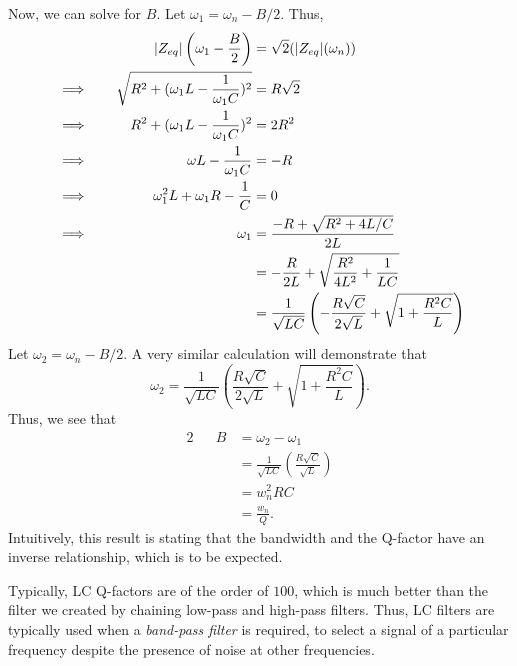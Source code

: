 \documentclass[letterpaper]{article}
\theoremstyle{remark}
\DeclarePairedDelimiter\abs{\lvert}{\rvert}%
\newcommand{\eqn}[1]{\begin{alignat*}{2}#1\end{alignat*}}
\newcommand*{\thus}{&\implies\quad&}
\begin{document}
Now, we can solve for $B$. Let $\omega_1 = \omega_n - B/2$. Thus,
\eqn{
    && \abs{Z_{eq}}\left(\omega_1 - \frac{B}{2}\right) &= \sqrt{2} (\abs{Z_{eq}}(\omega_n)) \\
    \thus \sqrt{R^2 + (\omega_1 L - \frac{1}{\omega_1 C})^2} &= R\sqrt{2} \\
    \thus R^2 + (\omega_1 L - \frac{1}{\omega_1 C})^2 &= 2R^2 \\
    \thus \omega L - \frac{1}{\omega_1 C} &= -R \\
    \thus \omega_1^2 L + \omega_1 R - \frac{1}{C} &= 0 \\
    \thus \omega_1 &= \frac{-R + \sqrt{R^2 + 4L / C}}{2L} \\
    &&&= -\frac{R}{2L} + \sqrt{\frac{R^2}{4L^2} + \frac{1}{LC}} \\
    &&&= \frac{1}{\sqrt{LC}} \left(-\frac{R\sqrt{C}}{2\sqrt{L}} + \sqrt{1 + \frac{R^2C}{L}} \right) \\
}
Let $\omega_2 = \omega_n - B/2$. A very similar calculation will demonstrate that
\[
    \omega_2 = \frac{1}{\sqrt{LC}} \left(\frac{R\sqrt{C}}{2\sqrt{L}} + \sqrt{1 + \frac{R^2C}{L}} \right).
\]
Thus, we see that
\eqn{
    && B &= \omega_2 - \omega_1 \\
    &&&= \frac{1}{\sqrt{LC}} \left(\frac{R\sqrt{C}}{\sqrt{L}} \right) \\
    &&&= w_n^2 RC \\
    &&&= \frac{w_n}{Q}.
}
Intuitively, this result is stating that the bandwidth and the Q-factor have an inverse relationship, which is to be expected.

Typically, LC Q-factors are of the order of $100$, which is much better than the filter we created by chaining low-pass and high-pass filters. Thus, LC filters are typically used when a \emph{band-pass filter} is required, to select a signal of a particular frequency despite the presence of noise at other frequencies.
\end{document}
